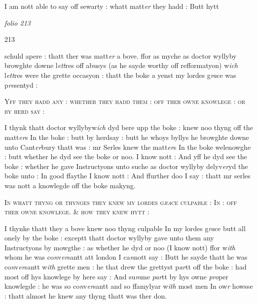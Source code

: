 \documentclass[12pt, a4paper]{book}
\begin{document}
		\ifthenelse{\isodd{\thepage}}
		{\reversemarginpar}
		{\normalmarginpar}
		I am nott able to say off sewarty : whatt matt\textit{er} they hadd : Butt hytt

\dotfill
						\newpage
{}

\textit{folio 213}


\begin{flushright}{\color{Mahogany}213}\end{flushright}

		\ifthenelse{\isodd{\thepage}}
		{\reversemarginpar}
		{\normalmarginpar}
		schuld apere : thatt ther was matt\textit{er} a bove. ffor as myche as doctor wyllyby
browghte downe l\textit{ett}res off abusys (as he sayde worthy off refformatyon)
w\textit{ich} l\textit{ett}res were the grette occasyon : thatt the boke a yenst my lordes g\textit{ra}ce
was p\textit{re}sentyd :
	
				\begin{center} \begin{large} {\scshape Yff they hadd any : whether they hadd them :
	off ther owne knowlege : or by herd say :} \end{large} \end{center}
			

		\ifthenelse{\isodd{\thepage}}
		{\reversemarginpar}
		{\normalmarginpar}
		I thynk thatt doctor wyllybyw\textit{ich} dyd bere upp the boke : knew noo
thyng off the matt\textit{er}s In the boke : butt by herdsay : butt he whoys
byllys he browghte downe unto Cant\textit{er}bury thatt was : mr Serles knew
the matt\textit{er}s In the boke welenowghe : butt whether he dyd see the
boke or noo. I know nott : And yff he dyd see the boke : whether
he gave Instructyons unto suche as doctor wyllyby delyv\textit{er}yd the 
boke unto : In good ffaythe I know nott : And ffurther doo I say :
thatt mr serles was nott a knowlegde off the boke makyng.
	
				\begin{center} \begin{large} {\scshape In whatt thyng or thynges they knew
	my lordes g\textit{ra}ce culpable : In : off ther owne
	knowlege. \& how they knew hytt :} \end{large} \end{center}
			

		\ifthenelse{\isodd{\thepage}}
		{\reversemarginpar}
		{\normalmarginpar}
		I thynke thatt they a bove knew noo thyng culpable In my lordes g\textit{ra}ce
butt all onely by the boke : exceptt thatt doctor wyllyby gave unto
them any Instructyons by mowgthe : as whether he dyd or noo (I 
know nott) ffor w\textit{ith} whom he was co\textit{n}v\textit{er}santt att london I ca\textit{n}nott
say : Butt he sayde thatt he was co\textit{n}v\textit{er}santt w\textit{ith} grette men : he
that drew the grettyst p\textit{ar}tt off the boke : had most off hys
knowlege by here say : And su\textit{m}me \textit{par}tt by hys owne \textit{pro}per knowlegde :
he was so co\textit{n}v\textit{er}santt and so ffamylyar w\textit{ith} most men In ow\textit{r} howsse : thatt
almost he knew any thyng thatt was ther 
			don.
\end{document}
